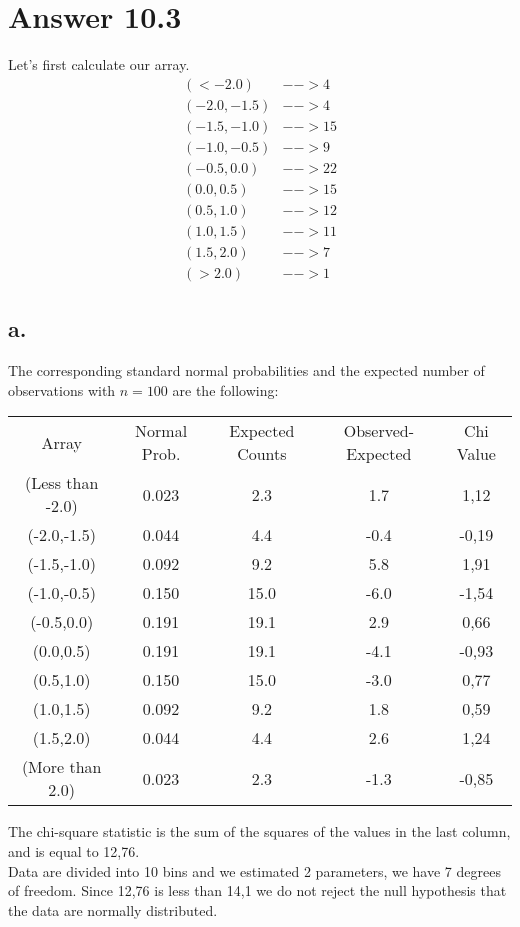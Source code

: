 \documentclass[12pt]{article}
\begin{document}
\section*{Answer 10.3}

Let's first calculate our array.
\begin{align*}
(<-2.0) &--> 4\\
(-2.0,-1.5) &--> 4\\
(-1.5,-1.0) &--> 15\\
(-1.0,-0.5) &--> 9\\
(-0.5,0.0) &--> 22\\
(0.0,0.5) &--> 15\\
(0.5,1.0) &--> 12\\
(1.0,1.5) &--> 11\\
(1.5,2.0) &--> 7\\
(>2.0) &--> 1
\end{align*}
\subsection*{a.}
The corresponding standard normal probabilities and the expected number of observations with $n = 100$ are the following:
\begin{center}
\begin{tabular}{ c c c c c}
 Array & Normal Prob.& Expected Counts & Observed- Expected & Chi Value \\ 
 (Less than -2.0) & 0.023 & 2.3 & 1.7 & 1,12\\  
 (-2.0,-1.5) & 0.044 & 4.4 & -0.4 & -0,19\\  
 (-1.5,-1.0) & 0.092 & 9.2 & 5.8 & 1,91\\
 (-1.0,-0.5) & 0.150 & 15.0 & -6.0 & -1,54\\
 (-0.5,0.0) & 0.191 & 19.1 & 2.9 & 0,66\\
 (0.0,0.5) & 0.191 & 19.1 & -4.1 & -0,93\\
 (0.5,1.0) & 0.150 & 15.0 & -3.0 & 0,77\\
 (1.0,1.5) & 0.092 & 9.2 & 1.8 & 0,59\\
 (1.5,2.0) & 0.044 & 4.4 & 2.6 & 1,24\\
 (More than 2.0) & 0.023 & 2.3 & -1.3 & -0,85\\ 
\end{tabular}
\end{center}
The chi-square statistic is the sum of the squares of the values in the last column, and is equal to  12,76.\\
Data are divided into 10 bins and we estimated 2 parameters, we have 7 degrees of freedom. Since 12,76 is less than 14,1 we do not reject the null hypothesis that the data are normally distributed.
\end{document}

